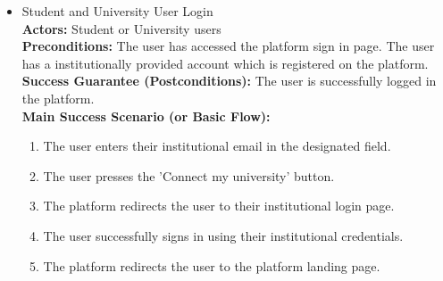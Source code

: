 \begin{itemize}[label={[\textbf{UC}]}, align=left, leftmargin=*]
    \item {} Student and University User Login\\
     \textbf{Actors:} Student or University users\\
     \textbf{Preconditions:} The user has accessed the platform sign in page. The user has a institutionally provided account which is registered on the platform.\\
     \textbf{Success Guarantee (Postconditions):} The user is successfully logged in the platform.\\
     \textbf{Main Success Scenario (or Basic Flow):} 
     \begin{enumerate}[label=\arabic*.] 
        \item The user enters their institutional email in the designated field.
        \item The user presses the 'Connect my university' button.
        \item The platform redirects the user to their institutional login page.
        \item The user successfully signs in using their institutional credentials.
        \item The platform redirects the user to the platform landing page.
     \end{enumerate} \\


\end{itemize}
